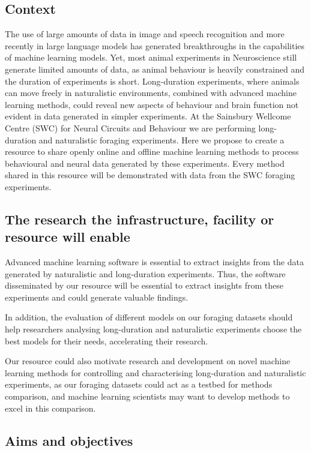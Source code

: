 \subsection{Context}

The use of large amounts of data in image and speech recognition and more
recently in large language models has generated breakthroughs in the
capabilities of machine learning models. Yet, most animal experiments in
Neuroscience still generate limited amounts of data, as animal behaviour is
heavily constrained and the duration of experiments is short.
%
Long-duration experiments, where animals can move freely in naturalistic
environments, combined with advanced machine learning methods, could reveal new
aspects of behaviour and brain function not evident in data generated in
simpler experiments.
%
At the Sainsbury Wellcome Centre (SWC) for Neural Circuits and Behaviour we are
performing long-duration and naturalistic foraging experiments.
%
Here we propose to create a resource to share openly online and offline machine
learning methods to process behavioural and neural data generated by these
experiments. Every method shared in this resource will be demonstrated with
data from the SWC foraging experiments.

\subsection{The research the infrastructure, facility or resource will enable}

Advanced machine learning software is essential to extract insights from the
data generated by naturalistic and long-duration experiments. Thus, the software
disseminated by our resource will be essential to extract insights from these
experiments and could generate valuable findings.

In addition, the evaluation of different models on our foraging datasets should
help researchers analysing long-duration and naturalistic experiments choose the
best models for their needs, accelerating their research.

Our resource could also motivate research and development on novel machine
learning methods for controlling and characterising long-duration and
naturalistic experiments, as our foraging datasets could act as a testbed for
methods comparison, and machine learning scientists may want to develop methods
to excel in this comparison.

\subsection{Aims and objectives}

